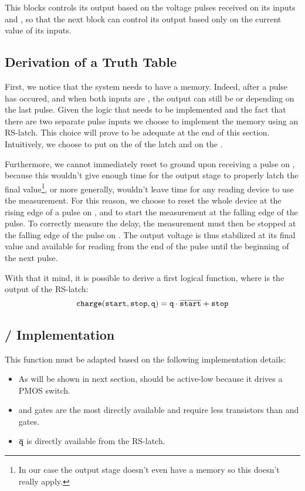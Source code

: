 This blocks controls its output  based on the voltage pulses received on its inputs  and , so that the next block  can control its output  based only on the current value of its inputs.

\subsection{Derivation of a Truth Table}
First, we notice that the system needs to have a memory.
Indeed, after a pulse has occured, and when both inputs are , the output  can still be  or  depending on the last pulse.
Given the logic that needs to be implemented and the fact that there are two separate pulse inputs we choose to implement the memory using an RS-latch.
This choice will prove to be adequate at the end of this section.
Intuitively, we choose to put  on the  of the latch and  on the .

Furthermore, we cannot immediately reset  to ground upon receiving a pulse on , because this wouldn't give enough time for the output stage to properly latch the final value\footnote{In our case the output stage doesn't even have a memory so this doesn't really apply.}, or more generally, wouldn't leave time for any reading device to use the measurement.
For this reason, we choose to reset the whole device at the rising edge of a pulse on , and to start the measurement at the falling edge of the pulse.
To correctly measure the delay, the measurement must then be stopped at the falling edge of the pulse on .
The output voltage is thus stabilized at its final value and available for reading from the end of the  pulse until the beginning of the next  pulse.

With that it mind, it is possible to derive a first logical function, where  is the output of the RS-latch:
\begin{equation}
\mathtt{charge}(\mathtt{start}, \mathtt{stop}, \mathtt{q}) = \mathtt{q}\cdot\overline{\mathtt{start}} + \mathtt{stop}\label{eqn:1logic}
\end{equation}

\subsection{\hspace{-.3em}/ Implementation}
This function must be adapted based on the following implementation details:
\begin{itemize}
  \item As will be shown in next section,  should be active-low because it drives a PMOS switch.
  \item {} and  gates are the most directly available and require less transistors than  and  gates.
  \item $\overline{\mathtt{q}}$ is directly available from the RS-latch.
\end{itemize}

